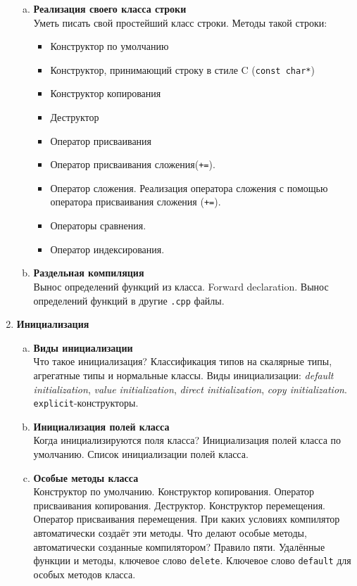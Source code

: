 \documentclass{article}
\begin{document}
\begin{enumerate}
\begin{enumerate}[a.]
\item \textbf{Реализация своего класса строки}\\
Уметь писать свой простейший класс строки.
Методы такой строки:
\begin{itemize}
\item Конструктор по умолчанию
\item Конструктор, принимающий строку в стиле C (\texttt{const char*})
\item Конструктор копирования
\item Деструктор
\item Оператор присваивания
\item Оператор присваивания сложения(\texttt{+=}). 
\item Оператор сложения. Реализация оператора сложения с помощью оператора присваивания сложения (\texttt{+=}).
\item Операторы сравнения.
\item Оператор индексирования.
\end{itemize}

\item \textbf{Раздельная компиляция}\\
Вынос определений функций из класса. Forward declaration. Вынос определений функций в другие \texttt{.cpp} файлы.


\end{enumerate}





\item \textbf{Инициализация}

\begin{enumerate}[a.]
\item \textbf{Виды инициализации}\\
Что такое инициализация? Классификация типов на скалярные типы, агрегатные типы и нормальные классы.
Виды инициализации: \textit{default initialization}, \textit{value initialization}, \textit{direct initialization}, \textit{copy initialization}. \texttt{explicit}-конструкторы.


\item \textbf{Инициализация полей класса}\\
Когда инициализируются поля класса? Инициализация полей класса по умолчанию.
Список инициализации полей класса. 

\item \textbf{Особые методы класса}\\
Конструктор по умолчанию. Конструктор копирования. Оператор присваивания копирования. Деструктор. Конструктор перемещения. Оператор присваивания перемещения. При каких условиях компилятор автоматически создаёт эти методы.
Что делают особые методы, автоматически созданные компилятором? Правило пяти. Удалённые функции и методы, ключевое слово \texttt{delete}. Ключевое слово \texttt{default} для особых методов класса.


\end{enumerate}
\end{enumerate}
\end{document}
